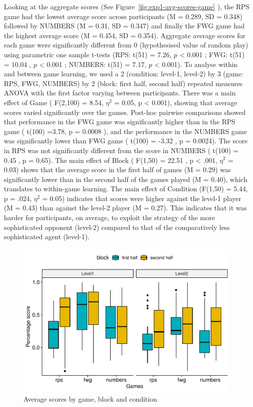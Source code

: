 \documentclass[man,floatsintext]{apa6}
\begin{document}
Looking at the aggregate scores (See Figure~\ref{fig:exp1-avg-scores-game} ), the RPS game had the lowest average score across participants (M = 0.289, SD = 0.348) followed by NUMBERS (M = 0.31, SD = 0.347) and finally the FWG game had the highest average score (M = 0.454, SD = 0.354). Aggregate average scores for each game were significantly different from 0 (hypothesised value of random play) using parametric one sample t-tests (RPS: t(51) = 7.26, \(p\) \textless{} 0.001 ; FWG: t(51) = 10.04 , \(p\) \textless{} 0.001 ; NUMBERS: t(51) = 7.17, \(p\) \textless{} 0.001).
To analyse within and between game learning, we used a 2 (condition: level-1, level-2) by 3 (game: RPS, FWG, NUMBERS) by 2 (block: first half, second half) repeated measures ANOVA with the first factor varying between participants. There was a main effect of Game ( F(2,100) = 8.54, \(\eta^{2}\) = 0.05, p \textless{} 0.001), showing that average scores varied significantly over the games. Post-hoc pairwise comparisons showed that performance in the FWG game was significantly higher than in the RPS game ( t(100) =3.78, p = 0.0008 ), and the performance in the NUMBERS game was significantly lower than FWG game ( t(100) = -3.32 , p = 0.0024). The score in RPS was not significantly different from the score in NUMBERS ( t(100) = 0.45 , p = 0.65). The main effect of Block ( F(1,50) = 22.51 , p \textless{} .001, \(\eta^{2}\) = 0.03) shows that the average score in the first half of games (M = 0.29) was significantly lower than in the second half of the games played (M = 0.40), which translates to within-game learning. The main effect of Condition (F(1,50) = 5.44, p = .024, \(\eta^{2}\) = 0.05) indicates that scores were higher against the level-1 player (M = 0.43) than against the level-2 player (M = 0.27). This indicates that it was harder for participants, on average, to exploit the strategy of the more sophisticated opponent (level-2) compared to that of the comparatively less sophisticated agent (level-1).

\begin{figure}

{\centering \includegraphics{draft_report_v3_files/figure-latex/exp1-3factor-plot-1} 

}

\caption{Average scores by game, block and condition}\label{fig:exp1-3factor-plot}
\end{figure}
\end{document}
